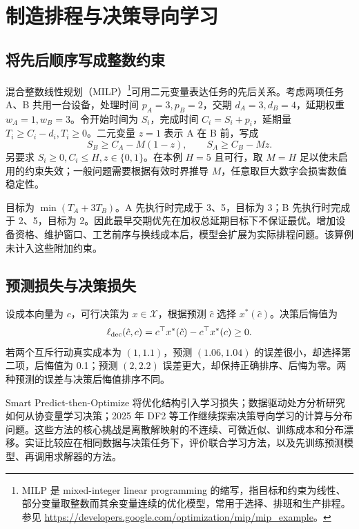 \section{制造排程与决策导向学习}

\subsection{将先后顺序写成整数约束}
混合整数线性规划（MILP）\footnote{MILP 是 mixed-integer linear programming 的缩写，指目标和约束为线性、部分变量取整数而其余变量连续的优化模型，常用于选择、排班和生产排程。参见 \url{https://developers.google.com/optimization/mip/mip_example}。}可用二元变量表达任务的先后关系。考虑两项任务 A、B 共用一台设备，处理时间 \(p_A=3,p_B=2\)，交期 \(d_A=3,d_B=4\)，延期权重 \(w_A=1,w_B=3\)。令开始时间为 \(S_i\)，完成时间 \(C_i=S_i+p_i\)，延期量 \(T_i\ge C_i-d_i,T_i\ge0\)。二元变量 \(z=1\) 表示 A 在 B 前，写成
\[
S_B\ge C_A-M(1-z),\qquad
S_A\ge C_B-Mz.
\]
另要求 \(S_i\ge0,C_i\le H,z\in\{0,1\}\)。在本例 \(H=5\) 且可行，取 \(M=H\) 足以使未启用的约束失效；一般问题需要根据有效时界推导 \(M\)，任意取巨大数字会损害数值稳定性。

目标为 \(\min(T_A+3T_B)\)。A 先执行时完成于 3、5，目标为 3；B 先执行时完成于 2、5，目标为 2。因此最早交期优先在加权总延期目标下不保证最优。增加设备资格、维护窗口、工艺前序与换线成本后，模型会扩展为实际排程问题。该算例未计入这些附加约束。

\subsection{预测损失与决策损失}
设成本向量为 \(c\)，可行决策为 \(x\in\mathcal X\)，根据预测 \(\hat c\) 选择 \(x^*(\hat c)\)。决策后悔值为
\[
\ell_{\rm dec}(\hat c,c)
=c^\top x^*(\hat c)-c^\top x^*(c)\ge0.
\]
若两个互斥行动真实成本为 \((1,1.1)\)，预测 \((1.06,1.04)\) 的误差很小，却选择第二项，后悔值为 0.1；预测 \((2,2.2)\) 误差更大，却保持正确排序、后悔为零。两种预测的误差与决策后悔值排序不同。

Smart Predict-then-Optimize 将优化结构引入学习损失\cite{spo09}；数据驱动处方分析研究如何从协变量学习决策\cite{bk2020}；2025 年 DF2 等工作继续探索决策导向学习的计算与分布问题\cite{df209}。这些方法的核心挑战是离散解映射的不连续、可微近似、训练成本和分布漂移。实证比较应在相同数据与决策任务下，评价联合学习方法，以及先训练预测模型、再调用求解器的方法。

